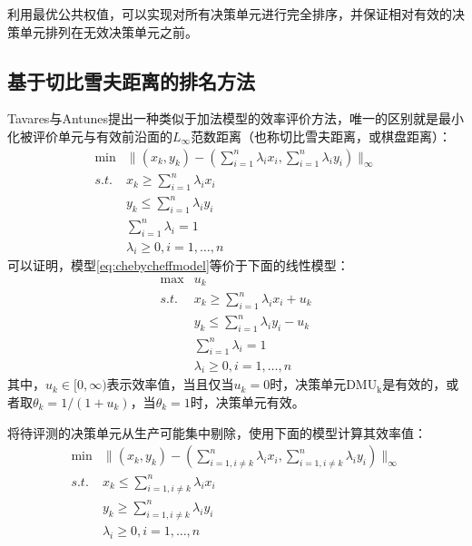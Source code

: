 利用最优公共权值，可以实现对所有决策单元进行完全排序，并保证相对有效的决策单元排列在无效决策单元之前。

\subsection{基于切比雪夫距离的排名方法}
Tavares与Antunes\cite{tavares2001atchebycheff}提出一种类似于加法模型的效率评价方法，唯一的区别就是最小化被评价单元与有效前沿面的$L_{\infty}$范数距离（也称切比雪夫距离，或棋盘距离）：
\begin{equation}\label{eq:chebycheffmodel}
  \begin{array}{ll}
    \min & \|(x_k, y_k) - (\sum\limits_{i=1}^n \lambda_i x_i,\sum\limits_{i=1}^n \lambda_i y_i)\|_{\infty}\\
    \textit{s.t.} & x_k \ge \sum\limits_{i=1}^n \lambda_i x_i \\
    & y_k \le \sum\limits_{i=1}^n \lambda_i y_i\\
    & \sum\limits_{i=1}^n \lambda_i = 1\\
    & \lambda_i \ge 0, i =1,\ldots, n
  \end{array}
\end{equation}
可以证明，模型\eqref{eq:chebycheffmodel}等价于下面的线性模型\cite{rezai2012ranking}：
\begin{equation}\label{eq:chebycheffmodel-eqv}
  \begin{array}{ll}
    \max & u_k\\
    \textit{s.t.} & x_k \ge \sum\limits_{i=1}^n \lambda_i x_i + u_k \\
    & y_k \le \sum\limits_{i=1}^n \lambda_i y_i - u_k\\
    & \sum\limits_{i=1}^n \lambda_i = 1\\
    & \lambda_i \ge 0, i =1,\ldots, n
  \end{array}
\end{equation}
其中，$u_k\in [0,\infty)$表示效率值，当且仅当$u_k =0$时，决策单元$\mathrm{DMU_k}$是有效的，或者取$\theta_k = 1/(1+u_k)$，当$\theta_k = 1$时，决策单元有效。

\cite{rezai2012ranking}将待评测的决策单元从生产可能集中剔除，使用下面的模型计算其效率值：
\begin{equation}
  \begin{array}{ll}
    \min & \|(x_k,y_k) - (\sum\limits_{i=1, i \ne k}^n \lambda_i x_i,\sum\limits_{i=1, i \ne k}^n \lambda_i y_i)\|_{\infty} \\
    \textit{s.t.} & x_k \le \sum\limits_{i=1, i \ne k}^n \lambda_i x_i \\
    & y_k \ge \sum\limits_{i=1, i \ne k}^n \lambda_i y_i\\
    & \lambda_i \ge 0, i =1,\ldots, n
  \end{array}
\end{equation}

